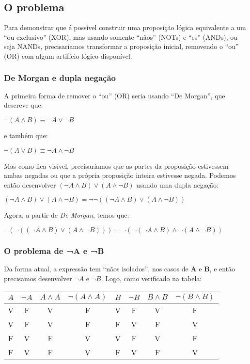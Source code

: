 \documentclass{article}
\begin{document}
\subsection{O problema}
Para demonstrar que é possível construir uma proposição lógica equivalente a um ``ou exclusivo'' (XOR), mas usando somente ``nãos'' (NOTs) e ``es'' (ANDs), ou seja NANDs, precisaríamos transformar a proposição inicial, removendo o ``ou'' (OR) com algum artifício lógico disponível.
\subsubsection{De Morgan e dupla negação}
A primeira forma de remover o ``ou'' (OR) seria usando ``De Morgan'', que descreve que:
\begin{center}
$\lnot (A\land B) \equiv \lnot A \lor \lnot B$   
\end{center}
e também que:
\begin{center}
$\lnot (A \lor B)  \equiv \lnot A \land \lnot B$   
\end{center}
Mas como fica visível, precisaríamos que as partes da proposição estivessem ambas negadas ou que a própria proposição inteira estivesse negada.
Podemos então desenvolver $(\lnot A\land B)\lor (A \land \lnot B)$ usando uma dupla negação:
\begin{center}
    $(\lnot A\land B)\lor (A\land \lnot B) = \lnot\lnot ((\lnot A\land B)\lor (A\land \lnot B))$
\end{center}
Agora, a partir de \emph{De Morgan}, temos que:
\begin{center}
  $\lnot(\lnot((\lnot A\land B)\lor (A\land \lnot B))) = \lnot(\lnot(\lnot A\land B)\land \lnot(A\land \lnot B))$  
\end{center}
\subsubsection{O problema de ¬A e ¬B}
Da forma atual, a expressão tem ``nãos isolados'', nos casos de \textbf{A} e \textbf{B}, e então precisamos desenvolver $\lnot A$ e $\lnot B$. Logo, como verificado na tabela:
\begin{center}
\begin{tabular}{cccccccc}
$A$ & $\lnot A$ & $A\land A$ & $\lnot (A\land A)$ & $B$ & $\lnot B$ & $B\land B$ & $\lnot (B\land B)$\\
\midrule
V & F & V & F & V & F & V & F\\
V & F & V & F & F & V & F & V\\
F & V & F & V & V & F & V & F\\
F & V & F & V & F & V & F & V
\end{tabular}
\end{center}
\end{document}

